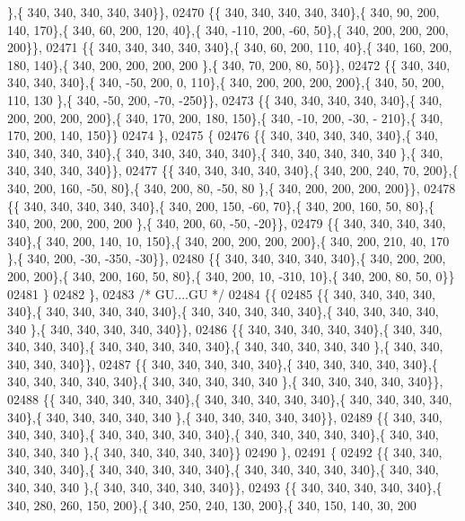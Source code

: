 \begin{DoxyCode}
      \},\{ 340, 340, 340, 340, 340\}\},
02470 \{\{ 340, 340, 340, 340, 340\},\{ 340,  90, 200, 140, 170\},\{ 340,  60, 200, 120,  40\},\{ 340, -110, 200, -60,  
      50\},\{ 340, 200, 200, 200, 200\}\},
02471 \{\{ 340, 340, 340, 340, 340\},\{ 340,  60, 200, 110,  40\},\{ 340, 160, 200, 180, 140\},\{ 340, 200, 200, 200, 200
      \},\{ 340,  70, 200,  80,  50\}\},
02472 \{\{ 340, 340, 340, 340, 340\},\{ 340, -50, 200,   0, 110\},\{ 340, 200, 200, 200, 200\},\{ 340,  50, 200, 110, 130
      \},\{ 340, -50, 200, -70, -250\}\},
02473 \{\{ 340, 340, 340, 340, 340\},\{ 340, 200, 200, 200, 200\},\{ 340, 170, 200, 180, 150\},\{ 340, -10, 200, -30, -
      210\},\{ 340, 170, 200, 140, 150\}\}
02474 \},
02475 \{
02476 \{\{ 340, 340, 340, 340, 340\},\{ 340, 340, 340, 340, 340\},\{ 340, 340, 340, 340, 340\},\{ 340, 340, 340, 340, 340
      \},\{ 340, 340, 340, 340, 340\}\},
02477 \{\{ 340, 340, 340, 340, 340\},\{ 340, 200, 240,  70, 200\},\{ 340, 200, 160, -50,  80\},\{ 340, 200,  80, -50,  80
      \},\{ 340, 200, 200, 200, 200\}\},
02478 \{\{ 340, 340, 340, 340, 340\},\{ 340, 200, 150, -60,  70\},\{ 340, 200, 160,  50,  80\},\{ 340, 200, 200, 200, 200
      \},\{ 340, 200,  60, -50, -20\}\},
02479 \{\{ 340, 340, 340, 340, 340\},\{ 340, 200, 140,  10, 150\},\{ 340, 200, 200, 200, 200\},\{ 340, 200, 210,  40, 170
      \},\{ 340, 200, -30, -350, -30\}\},
02480 \{\{ 340, 340, 340, 340, 340\},\{ 340, 200, 200, 200, 200\},\{ 340, 200, 160,  50,  80\},\{ 340, 200,  10, -310,  
      10\},\{ 340, 200,  80,  50,   0\}\}
02481 \}
02482 \},
02483 \textcolor{comment}{/* GU....GU */}
02484 \{\{
02485 \{\{ 340, 340, 340, 340, 340\},\{ 340, 340, 340, 340, 340\},\{ 340, 340, 340, 340, 340\},\{ 340, 340, 340, 340, 340
      \},\{ 340, 340, 340, 340, 340\}\},
02486 \{\{ 340, 340, 340, 340, 340\},\{ 340, 340, 340, 340, 340\},\{ 340, 340, 340, 340, 340\},\{ 340, 340, 340, 340, 340
      \},\{ 340, 340, 340, 340, 340\}\},
02487 \{\{ 340, 340, 340, 340, 340\},\{ 340, 340, 340, 340, 340\},\{ 340, 340, 340, 340, 340\},\{ 340, 340, 340, 340, 340
      \},\{ 340, 340, 340, 340, 340\}\},
02488 \{\{ 340, 340, 340, 340, 340\},\{ 340, 340, 340, 340, 340\},\{ 340, 340, 340, 340, 340\},\{ 340, 340, 340, 340, 340
      \},\{ 340, 340, 340, 340, 340\}\},
02489 \{\{ 340, 340, 340, 340, 340\},\{ 340, 340, 340, 340, 340\},\{ 340, 340, 340, 340, 340\},\{ 340, 340, 340, 340, 340
      \},\{ 340, 340, 340, 340, 340\}\}
02490 \},
02491 \{
02492 \{\{ 340, 340, 340, 340, 340\},\{ 340, 340, 340, 340, 340\},\{ 340, 340, 340, 340, 340\},\{ 340, 340, 340, 340, 340
      \},\{ 340, 340, 340, 340, 340\}\},
02493 \{\{ 340, 340, 340, 340, 340\},\{ 340, 280, 260, 150, 200\},\{ 340, 250, 240, 130, 200\},\{ 340, 150, 140,  30, 200

\end{DoxyCode}
